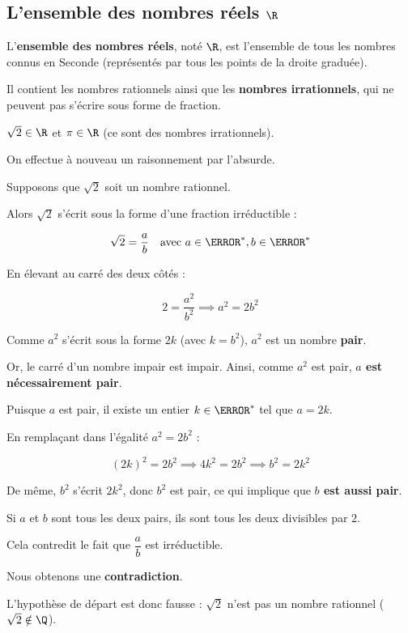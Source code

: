 \subsection{L'ensemble des nombres réels $\R$}

\begin{df}
	L'\textbf{ensemble des nombres réels}, noté $\R$, est l'ensemble de tous les nombres connus en Seconde (représentés par tous les points de la droite graduée).

	Il contient les nombres rationnels ainsi que les \textbf{nombres irrationnels}, qui ne peuvent pas s'écrire sous forme de fraction.
\end{df}

\begin{ex}
	$\sqrt{2} \in \R$ \quad et \quad $\pi \in \R$ \quad (ce sont des nombres irrationnels).
\end{ex}

\begin{demo}

	On effectue à nouveau un raisonnement par l'absurde.

	Supposons que $\sqrt{2}$ soit un nombre rationnel.

	Alors $\sqrt{2}$ s'écrit sous la forme d'une fraction irréductible :

	\[
		\sqrt{2} = \frac{a}{b} \quad \text{avec } a \in \N^*, b \in \N^*
	\]

	En élevant au carré des deux côtés :

	\[
		2 = \frac{a^2}{b^2} \implies a^2 = 2b^2
	\]

	Comme $a^2$ s'écrit sous la forme $2k$ (avec $k = b^2$), $a^2$ est un nombre \textbf{pair}.

	Or, le carré d'un nombre impair est impair. Ainsi, comme $a^2$ est pair, \textbf{$a$ est nécessairement pair}.

	Puisque $a$ est pair, il existe un entier $k \in \N^*$ tel que $a = 2k$.

	En remplaçant dans l'égalité $a^2 = 2b^2$ :

	\[
		(2k)^2 = 2b^2 \implies 4k^2 = 2b^2 \implies b^2 = 2k^2
	\]

	De même, $b^2$ s'écrit $2k^2$, donc $b^2$ est pair, ce qui implique que \textbf{$b$ est aussi pair}.

	Si $a$ et $b$ sont tous les deux pairs, ils sont tous les deux divisibles par $2$.

	Cela contredit le fait que $\dfrac{a}{b}$ est irréductible.

	Nous obtenons une \textbf{contradiction}.

	L'hypothèse de départ est donc fausse : $\sqrt{2}$ n'est pas un nombre rationnel ($\sqrt{2} \notin \Q$).
\end{demo}

